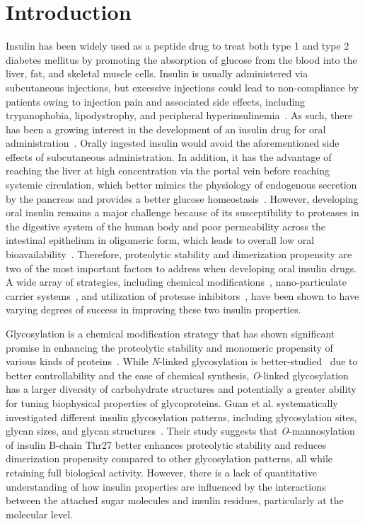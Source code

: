 \documentclass[sn-vancouver]{sn-jnl}
\begin{document}
\section{Introduction}
Insulin has been widely used as a peptide drug to treat both type 1 and type 2 diabetes mellitus by promoting the absorption of glucose from the blood into the liver, fat, and skeletal muscle cells. Insulin is usually administered via subcutaneous injections, but excessive injections could lead to non-compliance by patients owing to injection pain and associated side effects, including trypanophobia, lipodystrophy, and peripheral hyperinsulinemia~\cite{carino1999oral}. As such, there has been a growing interest in the development of an insulin drug for oral administration~\cite{carino1999oral, fonte2013oral, gedawy2018oral}. Orally ingested insulin would avoid the aforementioned side effects of subcutaneous administration. In addition, it has the advantage of reaching the liver at high concentration via the portal vein before reaching systemic circulation, which better mimics the physiology of endogenous secretion by the pancreas and provides a better glucose homeostasis~\cite{hoffman1997pharmacokinetic, owens2002new}. 
However, developing oral insulin remains a major challenge because of its susceptibility to proteases in the digestive system of the human body and poor permeability across the intestinal epithelium in oligomeric form, which leads to overall low oral bioavailability~\cite{bruno2013basics}. Therefore, proteolytic stability and dimerization propensity are two of the most important factors to address when developing oral insulin drugs. A wide array of strategies, including chemical modifications~\cite{hinds2002effects, clement2002oral}, nano-particulate carrier systems~\cite{deng2017selenium, bhattacharyya2017preparation, zhou2020nanocomposite}, and utilization of protease inhibitors~\cite{agarwal2000oral}, have been shown to have varying degrees of success in improving these two insulin properties. 

Glycosylation is a chemical modification strategy that has shown significant promise in enhancing the proteolytic stability and monomeric propensity of various kinds of proteins~\cite{kayser2011glycosylation, raju2006glycosylation,russell2009site}. While \emph{N}-linked glycosylation is better-studied~\cite{losev2019novel,van2004role, sareneva1995n} due to better controllability and the ease of chemical synthesis, \emph{O}-linked glycosylation has a larger diversity of carbohydrate structures and potentially a greater ability for tuning biophysical properties of glycoproteins. Guan et al. systematically investigated different insulin glycosylation patterns, including glycosylation sites, glycan sizes, and glycan structures~\cite{guan2018chemically}. Their study suggests that \emph{O}-mannosylation of insulin B-chain Thr27 better enhances proteolytic stability and reduces dimerization propensity compared to other glycosylation patterns, all while retaining full biological activity. However, there is a lack of quantitative understanding of how insulin properties are influenced by the interactions between the attached sugar molecules and insulin residues, particularly at the molecular level. 
\end{document}
